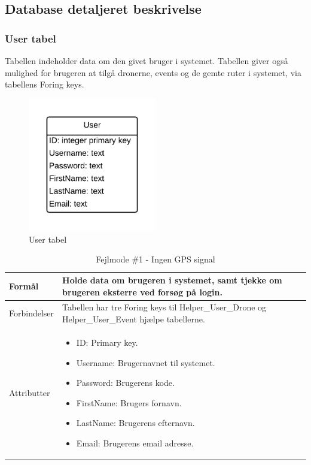 \newpage
\subsection{Database detaljeret beskrivelse}

\subsubsection{User tabel}
Tabellen indeholder data om den givet bruger i systemet. Tabellen giver også mulighed for brugeren at tilgå dronerne, events og de gemte ruter i systemet, via tabellens Foring keys.
\vspace{-5pt}
\begin{figure}[H]
	\centering
	\includegraphics[width=0.5\textwidth]{Billeder/database/UserTabel.png}
	\vspace{-5pt}
	\caption{User tabel}
	\label{fig:user_tabel}
\end{figure}

\begin{table}[H]
\begin{tabular}{| p{3cm}| p{11.5cm}|}
\hline

Formål	 							& Holde data om brugeren i systemet, samt tjekke om brugeren eksterre ved forsøg på login.\\\hline
Forbindelser						& Tabellen har tre Foring keys til Helper\_User\_Drone og Helper\_User\_Event hjælpe tabellerne.\\\hline
Attributter						& \begin{itemize}
												\item ID: Primary key.
												\item Username: Brugernavnet til systemet.
												\item Password: Brugerens kode.
												\item FirstName: Brugers fornavn.
												\item LastName: Brugerens efternavn.
												\item Email: Brugerens email adresse.
											\end{itemize} \\\hline 
\end{tabular}
\caption{Fejlmode \#1 - Ingen GPS signal}
\label{tab:fejlmode1}
\end{table}

